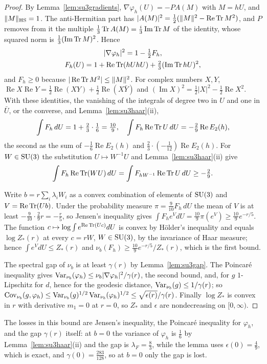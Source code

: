 \begin{proof}
By Lemma~\ref{lem:su3gradients}, $\nabla\varphi_h(U)=-PA(M)$ with $M=hU$, and
$\|M\|_{\rm HS}=1$. The anti-Hermitian part has $|A(M)|^2=\frac12(\|M\|^2-
\operatorname{Re}\operatorname{Tr} M^2)$, and $P$ removes from it the multiple $\frac13\operatorname{Tr} A(M)=\frac i3
\operatorname{Im}\operatorname{Tr} M$ of the identity, whose squared norm is
$\frac13(\operatorname{Im}\operatorname{Tr} M)^2$. Hence
\begin{gather*}
|\nabla\varphi_h|^2=1-\tfrac12F_h,\\
F_h(U)=1+\operatorname{Re}\operatorname{Tr}(hUhU)+\tfrac23(\operatorname{Im}\operatorname{Tr} hU)^2 ,
\end{gather*}
and $F_h\ge0$ because $|\operatorname{Re}\operatorname{Tr} M^2|\le\|M\|^2$. For complex numbers
$X,Y$, $\operatorname{Re}X\operatorname{Re}Y=\frac12\operatorname{Re}(XY)+
\frac12\operatorname{Re}(X\bar Y)$ and $(\operatorname{Im}X)^2=\frac12|X|^2-
\frac12\operatorname{Re}X^2$. With these identities, the vanishing of the
integrals of degree two in $U$ and one in $\bar U$, or the converse, and
Lemma~\ref{lem:su3haar}(ii),
\[
\int F_h\,dU=1+\tfrac23\cdot\tfrac16=\tfrac{10}9,\quad\int F_h\operatorname{Re}\operatorname{Tr} U\,dU=
-\tfrac29\operatorname{Re}E_2(h),
\]
the second as the sum of $-\frac16\operatorname{Re}E_2(h)$ and $\frac23
\cdot(-\frac1{12})\operatorname{Re}E_2(h)$. For $W\in\mathrm{SU}(3)$ the
substitution $U\mapsto W^{-1}U$ and Lemma~\ref{lem:su3haar}(ii) give
\[
\int F_h\operatorname{Re}\operatorname{Tr}(WU)\,dU=\int F_{hW^{-1}}\operatorname{Re}\operatorname{Tr} U\,dU\ge-\tfrac29 .
\]

Write $b=r\sum_i\lambda_iW_i$ as a convex combination of elements of
$\mathrm{SU}(3)$ and $V=\operatorname{Re}\operatorname{Tr}(Ub)$. Under the probability measure $\pi=\frac9{10}
F_h\,dU$ the mean of $V$ is at least $-\frac9{10}\cdot\frac29r=-\frac r5$,
so Jensen's inequality gives $\int F_he^VdU=\frac{10}9\pi(e^V)\ge\frac{10}9
e^{-r/5}$. The function $c\mapsto\log\int e^{\operatorname{Re}\operatorname{Tr}(Uc)}dU$ is convex by
H\"older's inequality and equals $\log Z_*(r)$ at every $c=rW$, $W\in
\mathrm{SU}(3)$, by the invariance of Haar measure; hence $\int e^VdU\le Z_*(r)$
and $\nu_b(F_h)\ge\frac{10}9e^{-r/5}/Z_*(r)$, which is the first bound.

The spectral gap of $\nu_b$ is at least $\gamma(r)$ by Lemma~\ref{lem:su3gap}.
The Poincar\'e inequality gives $\operatorname{Var}_{\nu_b}(\varphi_h)\le\nu_b|\nabla
\varphi_h|^2/\gamma(r)$, the second bound, and, for $g$ $1$-Lipschitz for
$d$, hence for the geodesic distance, $\operatorname{Var}_{\nu_b}(g)\le1/\gamma(r)$; so
$\operatorname{Cov}_{\nu_b}(g,\varphi_h)\le\operatorname{Var}_{\nu_b}(g)^{1/2}\operatorname{Var}_{\nu_b}(\varphi_h)^{1/2}
\le\sqrt{\epsilon(r)}/\gamma(r)$. Finally $\log Z_*$ is convex in $r$ with
derivative $m_1=0$ at $r=0$, so $Z_*$ and $\epsilon$ are nondecreasing on
$[0,\infty)$.
\end{proof}

The losses in this bound are Jensen's inequality, the Poincar\'e inequality
for $\varphi_h$, and the gap $\gamma(r)$ itself: at $b=0$ the variance of
$\varphi_h$ is $\frac16$ by Lemma~\ref{lem:su3haar}(ii) and the gap is
$\lambda_F=\frac83$, while the lemma uses $\epsilon(0)=\frac49$, which is
exact, and $\gamma(0)=\frac{283}{128}$, so at $b=0$ only the gap is lost.
